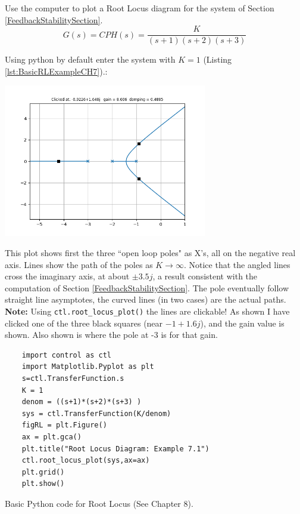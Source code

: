 \begin{ExampleSmall}
Use the computer to plot a Root Locus diagram for the system of Section \ref{FeedbackStabilitySection}.
\[
G(s)= CPH(s) = \frac{K}{(s+1)(s+2)(s+3)}
\]


Using python by default enter the system with $K=1$ (Listing \ref{lst:BasicRLExampleCH7}).:
%

\includegraphics[width=3.5in]{figs07/B47H33.png}

This plot shows first the three ``open loop poles" as X's, all on the negative
real axis.  Lines show the path of the poles as $K\to\infty$. Notice that the
angled lines cross the imaginary axis, at about $\pm3.5j$,
a result consistent with the computation of Section \ref{FeedbackStabilitySection}.
The pole eventually follow straight line asymptotes,
the curved lines (in two cases) are the actual paths. {\bf Note: }
Using {\tt ctl.root\_locus\_plot()} the lines are clickable!  As shown
I have clicked one of the three black squares  (near $-1+1.6j$),
and the gain value is shown.   Also shown is where the pole at -3 is
for that gain.
\end{ExampleSmall}



\begin{listing}
  \begin{verbatim}
    import control as ctl
    import Matplotlib.Pyplot as plt
    s=ctl.TransferFunction.s
    K = 1
    denom = ((s+1)*(s+2)*(s+3) )
    sys = ctl.TransferFunction(K/denom)
    figRL = plt.Figure()
    ax = plt.gca()
    plt.title("Root Locus Diagram: Example 7.1")
    ctl.root_locus_plot(sys,ax=ax)
    plt.grid()
    plt.show()
  \end{verbatim}
  \caption{Basic Python code for Root Locus (See Chapter 8).}
  \label{lst:BasicRLExampleCH7}
\end{listing}

